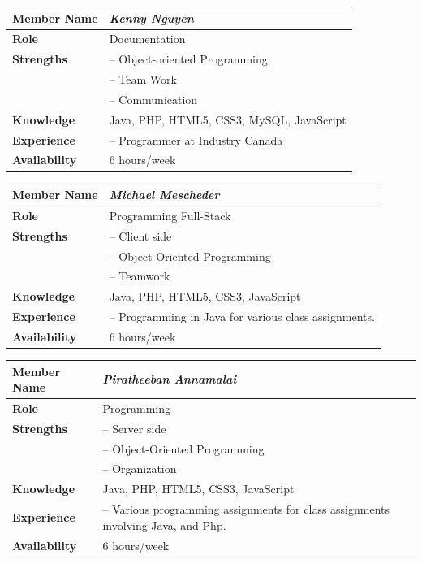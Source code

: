 \documentclass[12pt]{article}
\begin{document}
%
\vspace{3mm}
%
\begin{center}
\begin{tabular}{ p{2.7cm} | p{9cm} }
\hline
\textbf{Member Name}	&	\textit{\textbf{Kenny Nguyen}}	\\ \hline \hline
\textbf{Role}		&	Documentation	\\ \hline
\textbf{Strengths}	&	-- Object-oriented Programming	\\
			&	-- Team Work	\\
			&	-- Communication	\\ \hline
\textbf{Knowledge}	&	Java, PHP, HTML5, CSS3, MySQL, JavaScript 	\\ \hline
\textbf{Experience}	&	-- Programmer at Industry Canada	\\ \hline
\textbf{Availability}	&	6 hours/week	\\ \hline
\end{tabular}
\end{center}
%
\vspace{3mm}
%
\begin{center}
\begin{tabular}{ p{2.7cm} | p{9cm} }
\hline
\textbf{Member Name}	&	\textit{\textbf{Michael Mescheder}}	\\ \hline \hline
\textbf{Role}		&	Programming Full-Stack	\\ \hline
\textbf{Strengths}	&	-- Client side	\\
			&	-- Object-Oriented Programming	\\
			&	-- Teamwork	\\ \hline
\textbf{Knowledge}	&	Java, PHP, HTML5, CSS3, JavaScript	\\ \hline
\textbf{Experience}	&	-- Programming in Java for various class assignments.	\\ \hline
\textbf{Availability}	&	6 hours/week	\\ \hline
\end{tabular}
\end{center}
%
\vspace{3mm}
%
\begin{center}
\begin{tabular}{ p{2.7cm} | p{9cm} }
\hline
\textbf{Member Name}	&	\textit{\textbf{Piratheeban Annamalai}}	\\ \hline \hline
\textbf{Role}		&	Programming	\\ \hline
\textbf{Strengths}	&	-- Server side	\\
			&	-- Object-Oriented Programming	\\
			&	-- Organization	\\ \hline
\textbf{Knowledge}	&	Java, PHP, HTML5, CSS3, JavaScript	\\ \hline
\textbf{Experience}	&	-- Various programming assignments for class assignments involving Java, and Php.	\\ \hline
\textbf{Availability}	&	6 hours/week	\\ \hline
\end{tabular}
\end{center}
\end{document}
